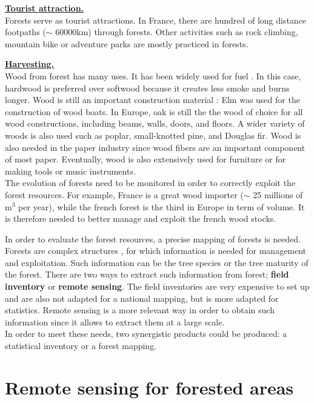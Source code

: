\textbf{\underline{Tourist attraction.}}\\
Forests serve as tourist attractions. In France, there are hundred of long distance footpaths ($\sim$ 60000km) through forests. Other activities such as rock climbing, mountain bike or adventure parks are mostly practiced in forests.

\textbf{\underline{Harvesting.}} \\
Wood from forest has many uses. It has been widely used for fuel \citep{sterrett1994alternative}. In this case, hardwood is preferred over softwood because it creates less smoke and burns longer. 
Wood is still an important construction material \citep{ramage2017wood}: Elm was used for the construction of wood boats. In Europe, oak is still the the wood of choice for all wood constructions, including beams, walls, doors, and floors. A wider variety of woods is also used such as poplar, small-knotted pine, and Douglas fir.
Wood is also needed in the paper industry since wood fibers are an important component of most paper. Eventually, wood is also extensively used for furniture or for making tools or music instruments. \\

The evolution of forests need to be monitored in order to correctly exploit the forest resources. For example, France is a great wood importer ($\sim$ 25 millions of m$^{3}$ per year), while the french forest is the third in Europe in term of volume. It is therefore needed to better manage and exploit the french wood stocks.

In order to evaluate the forest resources, a precise mapping of forests is needed.
Forests are complex structures \citep{pommerening2002approaches}, for which information is needed for management and exploitation. Such information can be the tree species or the tree maturity of the forest. There are two ways to extract such information from forest; \textbf{field inventory} or \textbf{remote sensing}. The field inventories are very expensive to set up and are also not adapted for a national mapping, but is more adapted for statistics. Remote sensing is a more relevant way in order to obtain such information since it allows to extract them at a large scale. \\

In order to meet these needs, two synergistic products could be produced: a statistical inventory or a forest mapping.

\section{Remote sensing for forested areas}

